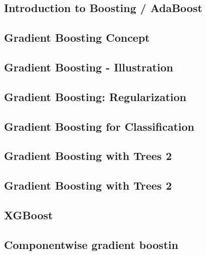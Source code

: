 




\subsection{Introduction to Boosting / AdaBoost}


\subsection{Gradient Boosting Concept}


\subsection{Gradient Boosting - Illustration}


\subsection{Gradient Boosting: Regularization}


\subsection{Gradient Boosting for Classification}


\subsection{Gradient Boosting with Trees 2}


\subsection{Gradient Boosting with Trees 2}


\subsection{XGBoost}


\subsection{Componentwise gradient boostin}









